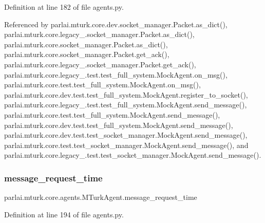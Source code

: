 Definition at line 182 of file agents.\+py.



Referenced by parlai.\+mturk.\+core.\+dev.\+socket\+\_\+manager.\+Packet.\+as\+\_\+dict(), parlai.\+mturk.\+core.\+legacy\+\_.\+socket\+\_\+manager.\+Packet.\+as\+\_\+dict(), parlai.\+mturk.\+core.\+socket\+\_\+manager.\+Packet.\+as\+\_\+dict(), parlai.\+mturk.\+core.\+socket\+\_\+manager.\+Packet.\+get\+\_\+ack(), parlai.\+mturk.\+core.\+legacy\+\_.\+socket\+\_\+manager.\+Packet.\+get\+\_\+ack(), parlai.\+mturk.\+core.\+legacy\+\_.\+test.\+test\+\_\+full\+\_\+system.\+Mock\+Agent.\+on\+\_\+msg(), parlai.\+mturk.\+core.\+test.\+test\+\_\+full\+\_\+system.\+Mock\+Agent.\+on\+\_\+msg(), parlai.\+mturk.\+core.\+dev.\+test.\+test\+\_\+full\+\_\+system.\+Mock\+Agent.\+register\+\_\+to\+\_\+socket(), parlai.\+mturk.\+core.\+legacy\+\_.\+test.\+test\+\_\+full\+\_\+system.\+Mock\+Agent.\+send\+\_\+message(), parlai.\+mturk.\+core.\+test.\+test\+\_\+full\+\_\+system.\+Mock\+Agent.\+send\+\_\+message(), parlai.\+mturk.\+core.\+dev.\+test.\+test\+\_\+full\+\_\+system.\+Mock\+Agent.\+send\+\_\+message(), parlai.\+mturk.\+core.\+dev.\+test.\+test\+\_\+socket\+\_\+manager.\+Mock\+Agent.\+send\+\_\+message(), parlai.\+mturk.\+core.\+test.\+test\+\_\+socket\+\_\+manager.\+Mock\+Agent.\+send\+\_\+message(), and parlai.\+mturk.\+core.\+legacy\+\_.\+test.\+test\+\_\+socket\+\_\+manager.\+Mock\+Agent.\+send\+\_\+message().

\mbox{\label{classparlai_1_1mturk_1_1core_1_1agents_1_1MTurkAgent_afb1d5e2911271fa42cc27e909681090a}} 
\subsubsection{\texorpdfstring{message\+\_\+request\+\_\+time}{message\_request\_time}}
{\footnotesize\ttfamily parlai.\+mturk.\+core.\+agents.\+M\+Turk\+Agent.\+message\+\_\+request\+\_\+time}



Definition at line 194 of file agents.\+py.



